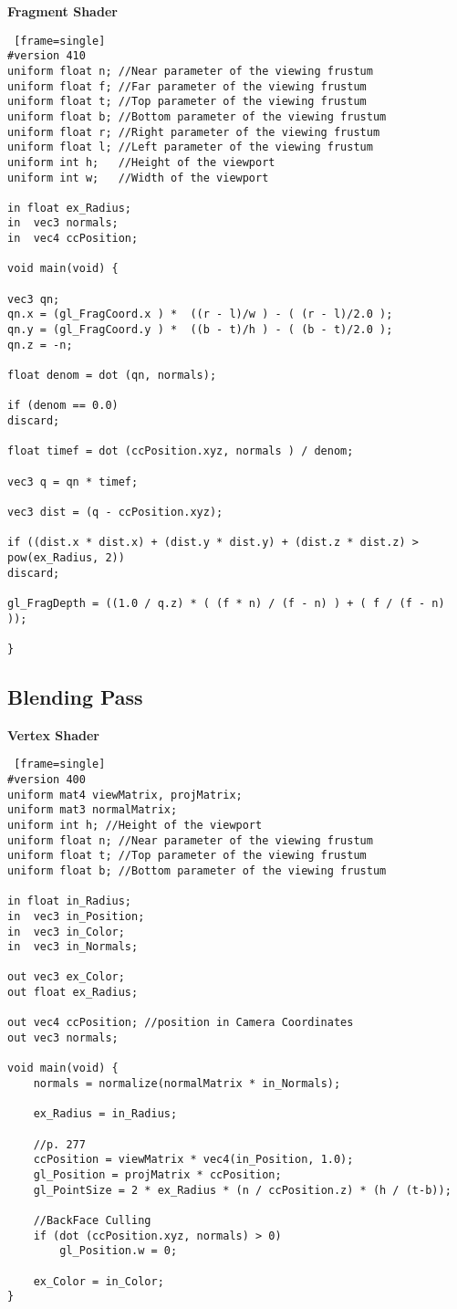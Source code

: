 \textbf{Fragment Shader}
\begin{lstlisting} [frame=single]
#version 410
uniform float n; //Near parameter of the viewing frustum
uniform float f; //Far parameter of the viewing frustum
uniform float t; //Top parameter of the viewing frustum
uniform float b; //Bottom parameter of the viewing frustum
uniform float r; //Right parameter of the viewing frustum
uniform float l; //Left parameter of the viewing frustum
uniform int h; 	 //Height of the viewport
uniform int w; 	 //Width of the viewport

in float ex_Radius;
in  vec3 normals;
in 	vec4 ccPosition;

void main(void) {

vec3 qn;
qn.x = (gl_FragCoord.x ) *  ((r - l)/w ) - ( (r - l)/2.0 );
qn.y = (gl_FragCoord.y ) *  ((b - t)/h ) - ( (b - t)/2.0 );
qn.z = -n;

float denom = dot (qn, normals);

if (denom == 0.0)
discard;

float timef = dot (ccPosition.xyz, normals ) / denom;

vec3 q = qn * timef;

vec3 dist = (q - ccPosition.xyz);

if ((dist.x * dist.x) + (dist.y * dist.y) + (dist.z * dist.z) > pow(ex_Radius, 2))
discard;

gl_FragDepth = ((1.0 / q.z) * ( (f * n) / (f - n) ) + ( f / (f - n) ));

}
\end{lstlisting}
\newpage

\subsection{Blending Pass}
\textbf{Vertex Shader}
\begin{lstlisting} [frame=single]
#version 400
uniform mat4 viewMatrix, projMatrix;
uniform mat3 normalMatrix;
uniform int h; //Height of the viewport
uniform float n; //Near parameter of the viewing frustum
uniform float t; //Top parameter of the viewing frustum
uniform float b; //Bottom parameter of the viewing frustum

in float in_Radius;
in  vec3 in_Position;
in  vec3 in_Color;
in 	vec3 in_Normals;

out vec3 ex_Color;
out float ex_Radius;

out vec4 ccPosition; //position in Camera Coordinates
out vec3 normals;

void main(void) {
	normals = normalize(normalMatrix * in_Normals);

	ex_Radius = in_Radius;

	//p. 277
	ccPosition = viewMatrix * vec4(in_Position, 1.0);
	gl_Position = projMatrix * ccPosition;
	gl_PointSize = 2 * ex_Radius * (n / ccPosition.z) * (h / (t-b));

	//BackFace Culling
	if (dot (ccPosition.xyz, normals) > 0)
		gl_Position.w = 0;

	ex_Color = in_Color;
}
\end{lstlisting}
\newpage

